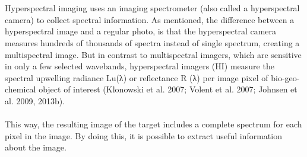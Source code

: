 \\\\
Hyperspectral imaging uses an imaging spectrometer (also called a hyperspectral camera) to collect spectral information. As mentioned, the difference between a hyperspectral image and a regular photo, is that the hyperspectral camera measures hundreds of thousands of spectra instead of single spectrum, creating a multispectral image. But in contrast to multispectral imagers, which are sensitive in only a few selected wavebands, hyperspectral imagers (HI) measure the spectral upwelling radiance Lu(λ) or reflectance R (λ) per image pixel of bio-geo-chemical object of interest (Klonowski et al. 2007; Volent et al. 2007; Johnsen et al. 2009, 2013b). %
\\\\
This way, the resulting image of the target includes a complete spectrum for each pixel in the image. By doing this, it is possible to extract useful information about the image. 
\\\\




